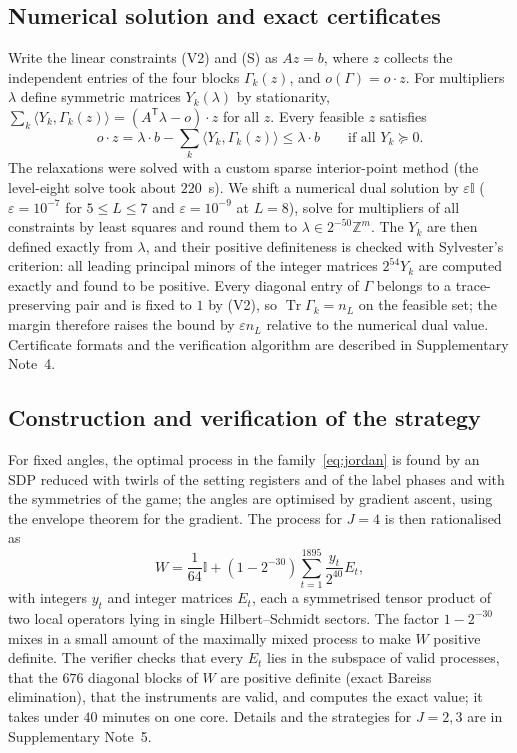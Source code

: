 \documentclass[11pt]{article}
\newcommand{\Tr}{\operatorname{Tr}}
\newcommand{\one}{\mathbb{I}}
\newcommand{\tp}{\mathsf{T}}
\newcommand{\ZZ}{\mathbb{Z}}
\begin{document}
\subsection*{Numerical solution and exact certificates}
Write the linear constraints (V2) and (S) as $Az=b$, where $z$ collects the independent entries of the four blocks $\Gamma_k(z)$, and $o(\Gamma)=o\cdot z$. For multipliers $\lambda$ define symmetric matrices $Y_k(\lambda)$ by stationarity, $\sum_k\langle Y_k,\Gamma_k(z)\rangle=(A^\tp\lambda-o)\cdot z$ for all $z$. Every feasible $z$ satisfies
\begin{equation}
o\cdot z=\lambda\cdot b-\sum_k\langle Y_k,\Gamma_k(z)\rangle\le\lambda\cdot b\qquad\text{if all }Y_k\succeq0 .
\label{eq:weakdual}
\end{equation}
The relaxations were solved with a custom sparse interior-point method (the level-eight solve took about $220$~s). We shift a numerical dual solution by $\varepsilon\one$ ($\varepsilon=10^{-7}$ for $5\le L\le7$ and $\varepsilon=10^{-9}$ at $L=8$), solve for multipliers of all constraints by least squares and round them to $\lambda\in2^{-50}\ZZ^m$. The $Y_k$ are then defined exactly from $\lambda$, and their positive definiteness is checked with Sylvester's criterion: all leading principal minors of the integer matrices $2^{54}Y_k$ are computed exactly and found to be positive. Every diagonal entry of $\Gamma$ belongs to a trace-preserving pair and is fixed to $1$ by (V2), so $\Tr\Gamma_k=n_L$ on the feasible set; the margin therefore raises the bound by $\varepsilon n_L$ relative to the numerical dual value. Certificate formats and the verification algorithm are described in Supplementary Note~4.

\subsection*{Construction and verification of the strategy}
For fixed angles, the optimal process in the family~\eqref{eq:jordan} is found by an SDP reduced with twirls of the setting registers and of the label phases and with the symmetries of the game; the angles are optimised by gradient ascent, using the envelope theorem for the gradient. The process for $J=4$ is then rationalised as
\begin{equation}
W=\frac{1}{64}\one+(1-2^{-30})\sum_{t=1}^{1895}\frac{y_t}{2^{40}}E_t ,
\label{eq:Wexplicit}
\end{equation}
with integers $y_t$ and integer matrices $E_t$, each a symmetrised tensor product of two local operators lying in single Hilbert--Schmidt sectors. The factor $1-2^{-30}$ mixes in a small amount of the maximally mixed process to make $W$ positive definite. The verifier checks that every $E_t$ lies in the subspace of valid processes, that the $676$ diagonal blocks of $W$ are positive definite (exact Bareiss elimination), that the instruments are valid, and computes the exact value; it takes under $40$ minutes on one core. Details and the strategies for $J=2,3$ are in Supplementary Note~5.
\end{document}
